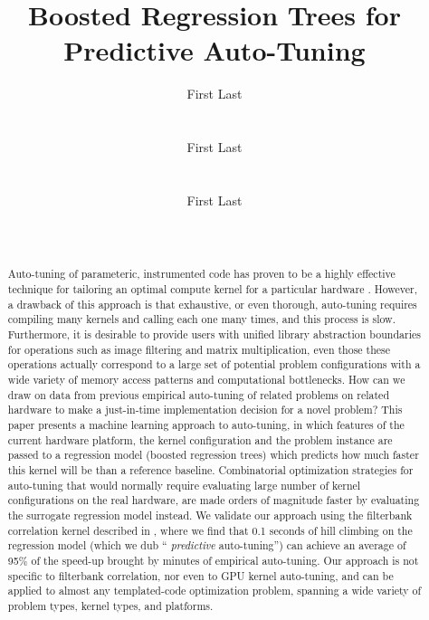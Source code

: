 \documentclass{sig-alternate}
\title{Boosted Regression Trees for Predictive Auto-Tuning}
\author{
\alignauthor First Last\\
\affaddr{Affiliation line 1}\\
\affaddr{Affiliation line 2}\\
\email{anon@mail.com}
\alignauthor First Last\\
\affaddr{Affiliation line 1}\\
\affaddr{Affiliation line 2}\\
\email{anon@mail.com}
\alignauthor First Last\\
\affaddr{Affiliation line 1}\\
\affaddr{Affiliation line 2}\\
\email{anon@mail.com}
}
\begin{document}
\maketitle

\begin{abstract}

Auto-tuning of parameteric, instrumented code has proven to be a highly
effective technique for tailoring an optimal compute kernel for a particular
hardware \cite{XXX}.
However, a drawback of this approach is that exhaustive, or even thorough,
auto-tuning requires compiling many kernels and calling each one many times,
and this process is slow.  Furthermore, it is desirable to provide users
with unified library abstraction boundaries for operations such as image
filtering and matrix multiplication, even those these operations actually
correspond to a large set of potential problem configurations with a wide
variety of memory access patterns and computational bottlenecks.  How can we
draw on data from previous empirical auto-tuning of related problems on related
hardware to make a just-in-time implementation decision for a novel problem?
This paper presents a machine learning approach to auto-tuning, in which
features of the current hardware platform, the kernel configuration and the
problem instance are passed to a regression model (boosted regression trees)
which predicts how much faster this kernel will be than a reference
baseline.  Combinatorial optimization strategies for auto-tuning that would
normally require evaluating large number of kernel configurations on the real
hardware, are made orders of magnitude faster by evaluating the surrogate
regression model instead.  We validate our approach using the filterbank
correlation kernel described in \citet{pinto+cox:2011gcg}, where we find that
0.1 seconds of hill climbing on the regression model (which we dub ``{\em
predictive} auto-tuning'') can achieve an average of 95\% of the
speed-up brought by minutes of empirical auto-tuning.  Our approach is not
specific to filterbank correlation, nor even to GPU kernel auto-tuning, and can
be applied to almost any templated-code optimization problem, spanning a wide
variety of problem types, kernel types, and platforms.

\end{abstract}


\end{document}
